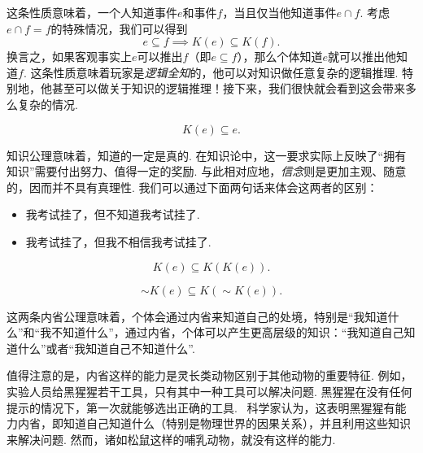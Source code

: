 这条性质意味着，一个人知道事件$e$和事件$f$，当且仅当他知道事件$e\cap f$. 考虑$e\cap f=f$的特殊情况，我们可以得到
\[e\subseteq f\implies K(e)\subseteq K(f).\]
换言之，如果客观事实上$e$可以推出$f$（即$e\subseteq f$），那么个体知道$e$就可以推出他知道$f$. 这条性质意味着玩家是\textit{逻辑全知}的，他可以对知识做任意复杂的逻辑推理. 特别地，他甚至可以做关于知识的逻辑推理！接下来，我们很快就会看到这会带来多么复杂的情况. 

\begin{proposition}
    \begin{equation}
        K(e)\subseteq e.\tag{K2}\label{eq:K2-knowledge}
    \end{equation}
\end{proposition}
知识公理意味着，知道的一定是真的. 在知识论中，这一要求实际上反映了“拥有知识”需要付出努力、值得一定的奖励. 与此相对应地，\textit{信念}则是更加主观、随意的，因而并不具有真理性. 我们可以通过下面两句话来体会这两者的区别：
    \begin{itemize}
        \item 我考试挂了，但不知道我考试挂了.
        \item 我考试挂了，但我不相信我考试挂了.
    \end{itemize}

\begin{proposition}[正内省公理]
    \begin{equation}
        K(e)\subseteq K(K(e)).\tag{K3}\label{eq:K3-positive-introspection}
    \end{equation}
\end{proposition}

\begin{proposition}[负内省公理]
    \begin{equation}
        \sim K(e)\subseteq K(\sim K(e)).\tag{K4}\label{eq:K4-negative-introspection}
    \end{equation}
\end{proposition}

这两条内省公理意味着，个体会通过内省来知道自己的处境，特别是“我知道什么”和“我不知道什么”，通过内省，个体可以产生更高层级的知识：“我知道自己知道什么”或者“我知道自己不知道什么”. 

值得注意的是，内省这样的能力是灵长类动物区别于其他动物的重要特征. 例如，实验人员给黑猩猩若干工具，只有其中一种工具可以解决问题. 黑猩猩在没有任何提示的情况下，第一次就能够选出正确的工具.~\cite{hanusChimpanzeeProblemsolvingContrasting2011} 科学家认为，这表明黑猩猩有能力内省，即知道自己知道什么（特别是物理世界的因果关系），并且利用这些知识来解决问题. 然而，诸如松鼠这样的哺乳动物，就没有这样的能力.~\cite{tomaselloEvolutionAgency2022}

